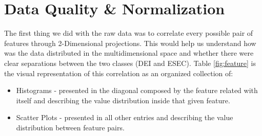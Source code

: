 \documentclass[extendedabs]{recpad2k}
\begin{document}


\section{Data Quality \& Normalization}\label{data}

The first thing we did with the raw data was to correlate every possible pair of features through 2-Dimensional projections.
This would help us understand how was the data distributed in the multidimensional space and whether there were clear separations between the two classes 
(DEI and ESEC).
Table \ref{fig:feature} is the visual representation of this correlation as an organized collection of:
\begin{itemize}[noitemsep,nolistsep]
\item Histograms - presented in the diagonal composed by the feature related with itself and describing the value distribution inside that given feature.
\item Scatter Plots - presented in all other entries and describing the value distribution between feature pairs.
\end{itemize}
\end{document}
